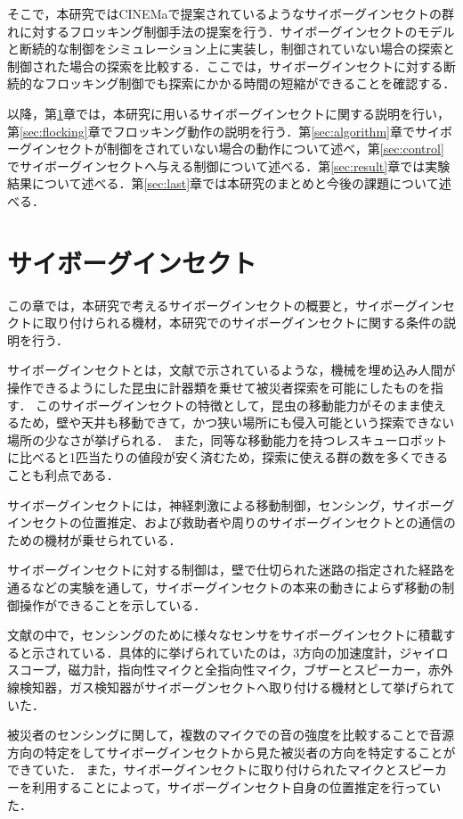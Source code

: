 \documentclass[a4paper,11pt]{jarticle}
\begin{document}
	そこで，本研究ではCINEMaで提案されているようなサイボーグインセクトの群れに対するフロッキング制御手法の提案を行う．サイボーグインセクトのモデルと断続的な制御をシミュレーション上に実装し，制御されていない場合の探索と制御された場合の探索を比較する．ここでは，サイボーグインセクトに対する断続的なフロッキング制御でも探索にかかる時間の短縮ができることを確認する．
	
	以降，第\ref{sec:CyborgInsect}章では，本研究に用いるサイボーグインセクトに関する説明を行い，第\ref{sec:flocking}章でフロッキング動作の説明を行う．第\ref{sec:algorithm}章でサイボーグインセクトが制御をされていない場合の動作について述べ，第\ref{sec:control}でサイボーグインセクトへ与える制御について述べる．第\ref{sec:result}章では実験結果について述べる．第\ref{sec:last}章では本研究のまとめと今後の課題について述べる．
	\section{サイボーグインセクト}
	\label{sec:CyborgInsect}
	この章では，本研究で考えるサイボーグインセクトの概要と，サイボーグインセクトに取り付けられる機材，本研究でのサイボーグインセクトに関する条件の説明を行う．
	
	サイボーグインセクトとは，文献\cite{CyborgInsect}で示されているような，機械を埋め込み人間が操作できるようにした昆虫に計器類を乗せて被災者探索を可能にしたものを指す．
	このサイボーグインセクトの特徴として，昆虫の移動能力がそのまま使えるため，壁や天井も移動できて，かつ狭い場所にも侵入可能という探索できない場所の少なさが挙げられる．
	また，同等な移動能力を持つレスキューロボットに比べると1匹当たりの値段が安く済むため，探索に使える群の数を多くできることも利点である．
	
	サイボーグインセクトには，神経刺激による移動制御，センシング，サイボーグインセクトの位置推定、および救助者や周りのサイボーグインセクトとの通信のための機材が乗せられている．
	
	サイボーグインセクトに対する制御は，壁で仕切られた迷路の指定された経路を通るなどの実験を通して，サイボーグインセクトの本来の動きによらず移動の制御操作ができることを示している\cite{CINEMa}．
	
	文献\cite{CINEMa}の中で，センシングのために様々なセンサをサイボーグインセクトに積載すると示されている．具体的に挙げられていたのは，3方向の加速度計，ジャイロスコープ，磁力計，指向性マイクと全指向性マイク，ブザーとスピーカー，赤外線検知器，ガス検知器がサイボーグンセクトへ取り付ける機材として挙げられていた．
	
	被災者のセンシングに関して，複数のマイクでの音の強度を比較することで音源方向の特定をしてサイボーグインセクトから見た被災者の方向を特定することができていた．
	また，サイボーグインセクトに取り付けられたマイクとスピーカーを利用することによって，サイボーグインセクト自身の位置推定を行っていた．
	
\end{document}
